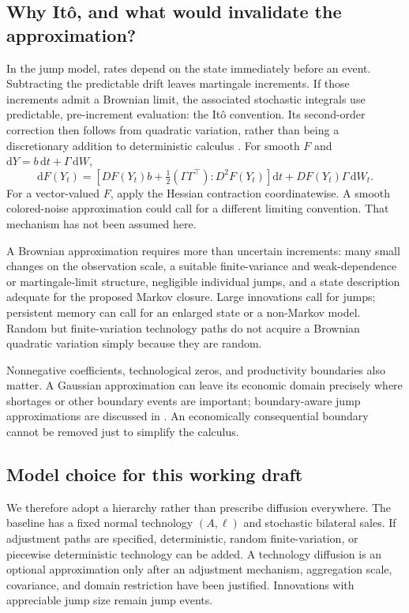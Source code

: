 \documentclass[11pt,letterpaper]{article}
\begin{document}
\subsection{Why It\^o, and what would invalidate the approximation?}
In the jump model, rates depend on the state immediately before an
event. Subtracting the predictable drift leaves martingale increments.
If those increments admit a Brownian limit, the associated stochastic
integrals use predictable, pre-increment evaluation: the It\^o
convention. Its second-order correction then follows from quadratic
variation, rather than being a discretionary addition to deterministic
calculus \cite{ks}. For smooth $F$ and
$\mathrm dY=b\,\mathrm dt+\Gamma\,\mathrm dW$,
\[
 \mathrm dF(Y_t)=
 \left[DF(Y_t)b+\tfrac12
       (\Gamma\Gamma^\top):D^2F(Y_t)\right]\mathrm dt
       +DF(Y_t)\Gamma\,\mathrm dW_t.
\]
For a vector-valued $F$, apply the Hessian contraction coordinatewise.
A smooth colored-noise approximation could call for a different
limiting convention. That mechanism has not been assumed here.

A Brownian approximation requires more than uncertain increments:
many small changes on the observation scale, a suitable finite-variance
and weak-dependence or martingale-limit structure, negligible individual
jumps, and a state description adequate for the proposed Markov closure.
Large innovations call for jumps; persistent memory can call for an
enlarged state or a non-Markov model. Random but finite-variation
technology paths do not acquire a Brownian quadratic variation simply
because they are random.

Nonnegative coefficients, technological zeros, and productivity boundaries
also matter. A Gaussian approximation can leave its economic domain
precisely where shortages or other boundary events are important;
boundary-aware jump approximations are discussed in
\cite{bibbona-sirovich}. An economically consequential boundary cannot
be removed just to simplify the calculus.

\subsection{Model choice for this working draft}
We therefore adopt a hierarchy rather than prescribe diffusion everywhere.
The baseline has a fixed normal technology $(A,\ell)$ and stochastic
bilateral sales. If adjustment paths are specified, deterministic,
random finite-variation, or piecewise deterministic technology can be
added. A technology diffusion is an optional approximation only after
an adjustment mechanism, aggregation scale, covariance, and domain
restriction have been justified. Innovations with appreciable jump size
remain jump events.
\end{document}

